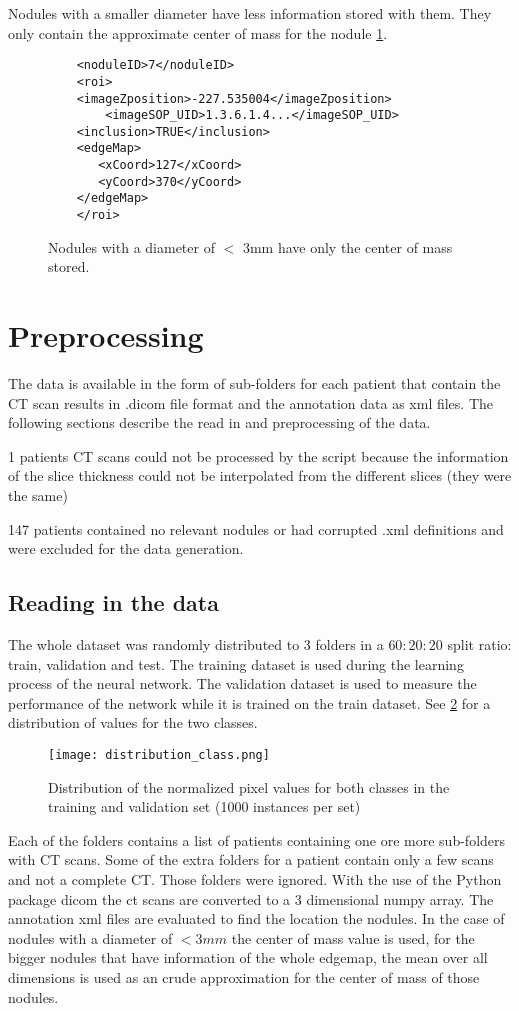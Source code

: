 \documentclass[../Thesis.tex]{subfiles}
\begin{document}
Nodules with a smaller diameter have less information stored with them. They only contain the approximate center of mass for the nodule \ref{fig:smallNod}.

\begin{figure}
\begin{lstlisting}
	<noduleID>7</noduleID>
	<roi>
	<imageZposition>-227.535004</imageZposition>
        <imageSOP_UID>1.3.6.1.4...</imageSOP_UID>
	<inclusion>TRUE</inclusion>
	<edgeMap>
	   <xCoord>127</xCoord>
	   <yCoord>370</yCoord>
	</edgeMap>
	</roi>
\end{lstlisting}
\caption{Nodules with a diameter of $<$ 3mm have only the center of mass stored.}
\label{fig:smallNod}
\end{figure}

\section{Preprocessing}
The data is available in the form of sub-folders for each patient that contain the CT scan results in .dicom file format and the annotation data as xml files. The following sections describe the read in and preprocessing of the data.

1 patients CT scans could not be processed by the script because the information of the slice thickness could not be interpolated from the different slices (they were the same)

147 patients contained no relevant nodules or had corrupted .xml definitions and were excluded for the data generation.

\subsection{Reading in the data}
The whole dataset was randomly distributed to 3 folders in a $60:20:20$ split ratio: train, validation and test. The training dataset is used during the learning process of the neural network. The validation dataset is used to measure the performance of the network while it is trained on the train dataset. See \ref{fig:ttdist} for a distribution of values for the two classes. 
\begin{figure}
\texttt{[image: distribution\_class.png]}
\caption{Distribution of the normalized pixel values for both classes in the training and validation set (1000 instances per set)}
\label{fig:ttdist}
\end{figure}
Each of the folders contains a list of patients containing one ore more sub-folders with CT scans. Some of the extra folders for a patient contain only a few scans and not a complete CT. Those folders were ignored. With the use of the Python package dicom \cite{mason2011t} the ct scans are converted to a 3 dimensional numpy array. The annotation xml files are evaluated to find the location the nodules. In the case of nodules with a diameter of $<3mm$ the center of mass value is used, for the bigger nodules that have information of the whole edgemap, the mean over all dimensions is used as an crude approximation for the center of mass of those nodules. 
\end{document}
